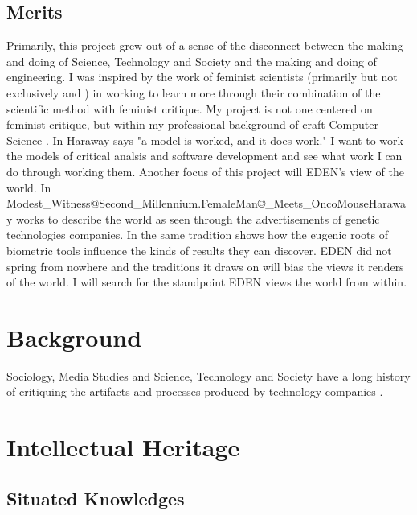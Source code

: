 \documentclass[a4paper,man,natbib]{apa6}
\begin{document}
   \subsection*{Merits}
   Primarily, this project grew out of a sense of the disconnect between the making and doing of Science, Technology and Society and the making and doing of engineering. I was inspired by the work of feminist scientists (primarily but not exclusively \citet{Roy2018-ma} and \citet{Subramaniam2014-wg}) in working to learn more through their combination of the scientific method with feminist critique. My project is not one centered on feminist critique, but within my professional background of craft Computer Science \citep[see][]{Ensmenger2012-kz}. In \citet[p. 63]{Haraway2016-nc} Haraway says "a model is worked, and it does work." I want to work the models of critical analsis and software development and see what work I can do through working them.
   Another focus of this project will EDEN's view of the world. In Modest\_Witness@Second\_Millennium.FemaleMan\copyright\_Meets\_OncoMouse\texttrademark Haraway works to describe the world as seen through the advertisements of genetic technologies companies. In the same tradition \citet{Subramaniam2014-wg} shows how the eugenic roots of biometric tools influence the kinds of results they can discover. EDEN did not spring from nowhere and the traditions it draws on will bias the views it renders of the world. I will search for the standpoint \citet{Haraway1993-kw} EDEN views the world from within.
   \section*{Background}
   Sociology, Media Studies and Science, Technology and Society have a long history of critiquing the artifacts and processes produced by technology companies \citep{Cheney-Lippold2018-lw,Dean2010-lk,Harraway1997-va}. 

   \section*{Intellectual Heritage}
   \subsection*{Situated Knowledges}
\end{document}
